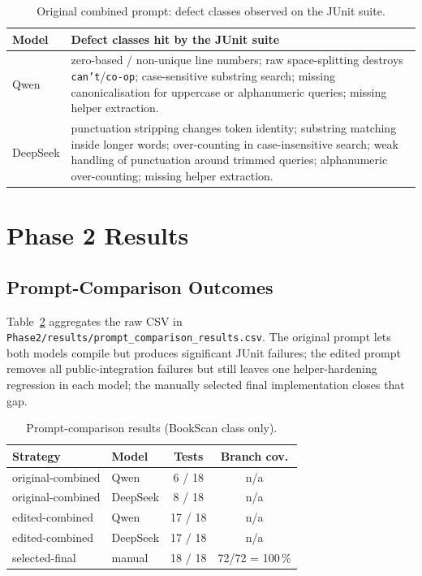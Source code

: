 \documentclass[journal]{IEEEtran}
\begin{document}
\begin{table}[!t]
\renewcommand{\arraystretch}{1.15}
\caption{Original combined prompt: defect classes observed on the JUnit suite.}
\label{tab:failure-modes}
\centering
\footnotesize
\begin{tabular}{@{}lp{6.0cm}@{}}
\toprule
\textbf{Model} & \textbf{Defect classes hit by the JUnit suite} \\
\midrule
Qwen     & zero-based / non-unique line numbers; raw space-splitting destroys \texttt{can't}/\texttt{co-op}; case-sensitive substring search; missing canonicalisation for uppercase or alphanumeric queries; missing helper extraction. \\
DeepSeek & punctuation stripping changes token identity; substring matching inside longer words; over-counting in case-insensitive search; weak handling of punctuation around trimmed queries; alphanumeric over-counting; missing helper extraction. \\
\bottomrule
\end{tabular}
\end{table}

\section{Phase 2 Results}\label{sec:phase2-results}

\subsection{Prompt-Comparison Outcomes}

Table~\ref{tab:phase2-cmp} aggregates the raw CSV in
\texttt{Phase2/results/prompt\_comparison\_results.csv}. The original
prompt lets both models compile but produces significant JUnit failures;
the edited prompt removes all public-integration failures but still leaves
one helper-hardening regression in each model; the manually selected
final implementation closes that gap.

\begin{table}[!t]
\renewcommand{\arraystretch}{1.15}
\caption{Prompt-comparison results (BookScan class only).}
\label{tab:phase2-cmp}
\centering
\footnotesize
\begin{tabular}{@{}llcc@{}}
\toprule
\textbf{Strategy} & \textbf{Model} & \textbf{Tests} & \textbf{Branch cov.} \\
\midrule
original-combined & Qwen     & 6 / 18  & n/a \\
original-combined & DeepSeek & 8 / 18  & n/a \\
edited-combined   & Qwen     & 17 / 18 & n/a \\
edited-combined   & DeepSeek & 17 / 18 & n/a \\
selected-final    & manual   & 18 / 18 & 72/72 = 100\,\% \\
\bottomrule
\end{tabular}
\end{table}
\end{document}
